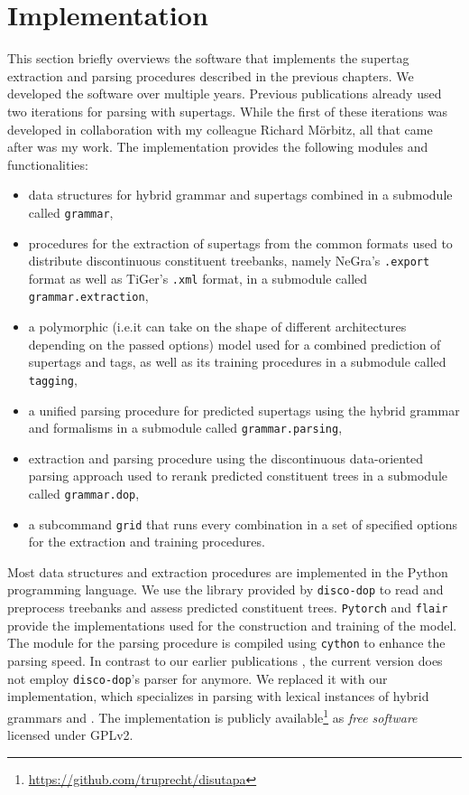\documentclass[../../document.tex]{subfiles}
\begin{document}
    \section{Implementation}\label{sec:implementation}
    This section briefly overviews the software that implements the supertag extraction and parsing procedures described in the previous chapters.
    We developed the software over multiple years. Previous publications already used two iterations for parsing with  supertags. \citep{RupMoe21,Rup22}
    While the first of these iterations was developed in collaboration with my colleague Richard Mörbitz, all that came after was my work.
    The implementation provides the following modules and functionalities:
    \begin{itemize}
        \item data structures for hybrid grammar and  supertags combined in a submodule called \texttt{grammar},
        \item procedures for the extraction of supertags from the common formats used to distribute discontinuous constituent treebanks, namely NeGra's \texttt{.export} format as well as TiGer's \texttt{.xml} format, in a submodule called \texttt{grammar.extraction},
        \item a polymorphic (i.e.\@ it can take on the shape of different architectures depending on the passed options)  model used for a combined prediction of supertags and  tags, as well as its training procedures in a submodule called \texttt{tagging}, 
        \item a unified parsing procedure for predicted supertags using the hybrid grammar and  formalisms in a submodule called \texttt{grammar.parsing},
        \item extraction and parsing procedure using the discontinuous data-oriented parsing approach used to rerank predicted constituent trees in a submodule called \texttt{grammar.dop},
        \item a subcommand \texttt{grid} that runs every combination in a set of specified options for the extraction and training procedures.
    \end{itemize}
    
    Most data structures and extraction procedures are implemented in the Python programming language.
    We use the library provided by \texttt{disco-dop} \citep{Cra12} to read and preprocess treebanks and assess predicted constituent trees.
    \texttt{Pytorch} \citep{paszke2019pytorch} and \texttt{flair} \citep{Akb19} provide the implementations used for the construction and training of the  model.
    The module for the parsing procedure is compiled using \texttt{cython} \citep{behnel2011cython} to enhance the parsing speed.
    In contrast to our earlier publications \citet{RupMoe21,Rup22}, the current version does not employ \texttt{disco-dop}'s parser for  anymore.
    We replaced it with our implementation, which specializes in parsing with lexical instances of hybrid grammars and .
    The implementation is publicly available\footnote{\url{https://github.com/truprecht/disutapa}} as \emph{free software} licensed under GPLv2.
\end{document}
